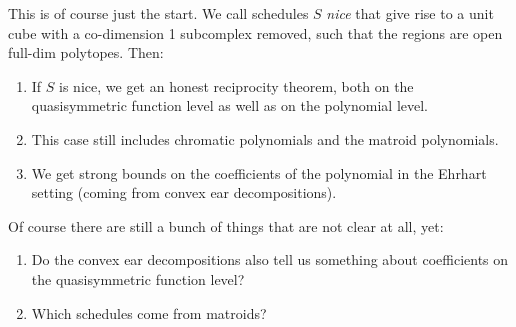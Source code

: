 \documentclass[11pt,letter]{amsart}
\newcommand{\defn}[1]{\emph{#1}}
\begin{document}
This is of course just the start. We call schedules $S$ \defn{nice} that give rise to a unit cube with a co-dimension 1 subcomplex removed, such that the regions are open full-dim polytopes. Then:
\begin{enumerate}
\item If $S$ is nice, we get an honest reciprocity theorem, both on the quasisymmetric function level as well as on the polynomial level.
\item This case still includes chromatic polynomials and the matroid polynomials.
\item We get strong bounds on the coefficients of the polynomial in the Ehrhart setting (coming from convex ear decompositions).
\end{enumerate}

Of course there are still a bunch of things that are not clear at all, yet:
\begin{enumerate} 
\item Do the convex ear decompositions also tell us something about coefficients on the quasisymmetric function level?
\item Which schedules come from matroids? 
\end{enumerate}




\end{document}
